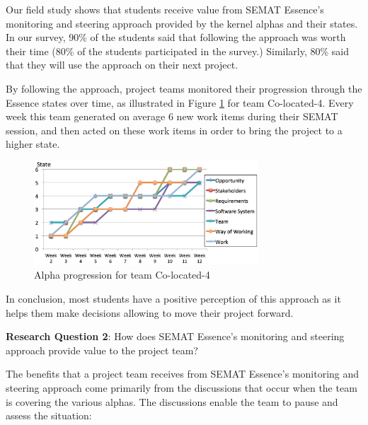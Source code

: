 Our field study shows that students receive value from SEMAT Essence's monitoring and steering approach provided by the kernel alphas and their states. In our survey, 90\% of the students said that following the approach was worth their time (80\% of the students participated in the survey.) Similarly, 80\% said that they will use the approach on their next project.

By following the approach, project teams monitored their progression through the Essence states over time, as illustrated in Figure \ref{AlphaProgressionColocated4} for team Co-located-4. Every week this team generated on average 6 new work items during their SEMAT session, and then acted on these work items in order to bring the project to a higher state.

\begin{figure}[h]
\centering
\includegraphics[width=3.30in]{project_steering_images/AlphaProgressionColocated4.png}
\caption{Alpha progression for team Co-located-4}
\label{AlphaProgressionColocated4}
\end{figure}


In conclusion, most students have a positive perception of this approach as it helps them make decisions allowing to move their project forward.

\textbf{Research Question 2}: How does SEMAT Essence's monitoring and steering approach provide value to the project team?

The benefits that a project team receives from SEMAT Essence's monitoring and steering approach come primarily from the discussions that occur when the team is covering the various alphas. The discussions enable the team to pause and assess the situation:


